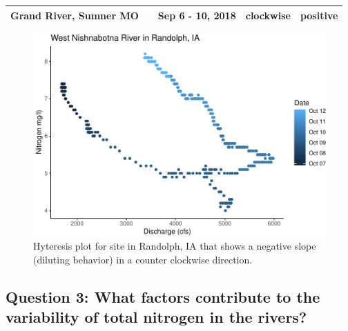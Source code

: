 \documentclass[12pt,]{article}
\begin{document}
\begin{longtable}[]{@{}lclll@{}}
\begin{minipage}[t]{0.15\columnwidth}
Grand River, Sumner MO\strut
\end{minipage} & \begin{minipage}[t]{0.22\columnwidth}\centering
06902000\strut
\end{minipage} & \begin{minipage}[t]{0.20\columnwidth}\raggedright
Sep 6 - 10, 2018\strut
\end{minipage} & \begin{minipage}[t]{0.17\columnwidth}\raggedright
clockwise\strut
\end{minipage} & \begin{minipage}[t]{0.12\columnwidth}\raggedright
positive\strut
\end{minipage}\tabularnewline
\bottomrule
\end{longtable}

\begin{figure}
\centering
\includegraphics{Missouri-Reasearch-Project---FINAL_files/figure-latex/Randolphstorm-1.pdf}
\caption{Hyteresis plot for site in Randolph, IA that shows a negative
slope (diluting behavior) in a counter clockwise direction.}
\end{figure}

\hypertarget{question-3-what-factors-contribute-to-the-variability-of-total-nitrogen-in-the-rivers}{%
\subsection{Question 3: What factors contribute to the variability of
total nitrogen in the
rivers?}\label{question-3-what-factors-contribute-to-the-variability-of-total-nitrogen-in-the-rivers}}
\end{document}
